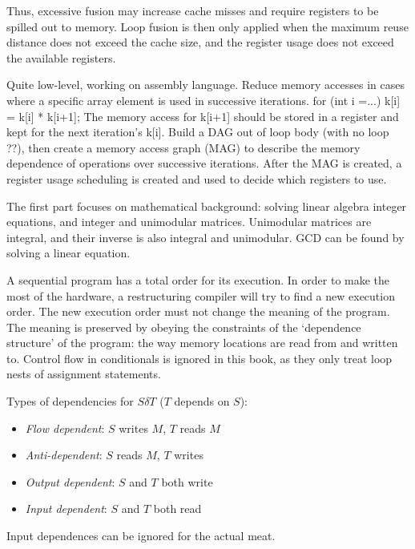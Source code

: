 Thus, excessive fusion may increase cache misses and require registers to be spilled out to memory.
Loop fusion is then only applied when the maximum reuse distance does not exceed the cache size,
and the register usage does not exceed the available registers.


Quite low-level, working on assembly language.
Reduce memory accesses in cases where a specific array element is used in successive iterations.
  for (int i =...)
    k[i] = k[i] * k[i+1];
The memory access for k[i+1] should be stored in a register and kept for the next iteration's k[i].
Build a DAG out of loop body (with no loop ??), then create a memory access graph (MAG) to describe the memory dependence of operations over successive iterations.
After the MAG is created, a register usage scheduling is created and used to decide which registers to use.


The first part focuses on mathematical background: solving linear algebra integer equations, and integer and unimodular matrices.
Unimodular matrices are integral, and their inverse is also integral and unimodular. GCD can be found by solving a linear equation.

A sequential program has a total order for its execution. In order to make the most of the hardware, a restructuring compiler
will try to find a new execution order. The new execution order must not change the meaning of the program.
The meaning is preserved by obeying the constraints of the `dependence structure' of the program:
the way memory locations are read from and written to.
Control flow in conditionals is ignored in this book, as they only treat loop nests of assignment statements.

Types of dependencies for $S \delta T$ ($T$ depends on $S$):
\begin{itemize}
\item \emph{Flow dependent}: $S$ writes $M$, $T$ reads $M$
\item \emph{Anti-dependent}: $S$ reads $M$, $T$ writes
\item \emph{Output dependent}: $S$ and $T$ both write
\item \emph{Input dependent}: $S$ and $T$ both read
\end{itemize}

Input dependences can be ignored for the actual meat.

